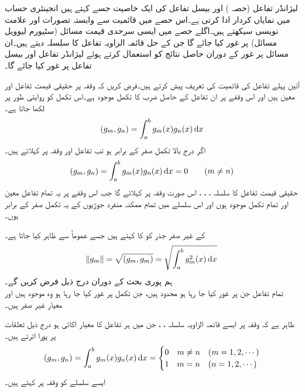 لیژانڈر تفاعل (حصہ ) اور بیسل تفاعل کی ایک خاصیت جسے  کہتے ہیں انجینئری حساب میں نمایاں کردار ادا کرتی ہے۔اس حصے میں قائمیت سے وابستہ تصورات اور  علامت نویسی سیکھتے ہیں۔اگلے حصے میں  ایسی سرحدی قیمت مسائل (سٹیورم لیوویل مسائل) پر غور کیا جائے گا جن کے حل قائمہ الزاویہ تفاعل کا سلسلہ دیتے ہیں۔ان مسائل  پر غور کے دوران حاصل نتائج کو استعمال کرتے ہوئے لیژانڈر تفاعل اور بیسل تفاعل پر غور کیا جائے گا۔

آئیں پہلے تفاعل کی قائمیت کی تعریف پیش کرتے ہیں۔فرض کریں کہ وقفہ  پر حقیقی قیمت تفاعل  اور  معین ہیں اور اس وقفے پر ان تفاعل کے حاصل ضرب  کا تکمل موجود ہے۔اس تکمل کو روایتی طور پر  لکھا جاتا ہے۔
\begin{align}
(g_m,g_n)=\int_{a}^{b} g_m(x)g_n(x)\dif x
\end{align}
اگر درج بالا تکمل صفر کے برابر ہو تب تفاعل  اور  وقفہ  پر   کہلاتے ہیں۔
\begin{align}
(g_m,g_n)=\int_{a}^{b} g_m(x)g_n(x)\dif x=0\quad \quad (m \ne n)
\end{align}
حقیقی قیمت تفاعل کا سلسلہ ، ، ،  اس صورت وقفہ   پر   کہلائے گا جب اس وقفے پر یہ تمام تفاعل معین اور تمام تکمل  موجود ہوں اور اس سلسلے میں تمام ممکنہ منفرد جوڑیوں کے یہ تکمل صفر کے برابر ہوں۔ 

 کے غیر صفر جذر کو  کا  کہتے ہیں جسے عموماً  سے ظاہر کیا جاتا ہے۔
\begin{align}
\norm{g_m}=\sqrt{(g_m,g_m)}=\sqrt{\int_{a}^{b} g_m^2(x)\dif x}
\end{align}
ہم پوری بحث کے دوران درج ذیل فرض کریں گے۔\\
 \quad تمام تفاعل جن پر غور کیا جا رہا ہو محدود ہیں، جن تکمل پر غور کیا جا رہا ہو وہ موجود ہیں اور معیار غیر صفر ہیں۔

 ظاہر ہے کہ وقفہ  پر ایسے قائمہ الزاویہ سلسلہ ، ،  جن  میں ہر تفاعل کا معیار اکائی  ہو درج ذیل تعلقات پر پورا اترتے ہیں۔
\begin{align}
(g_m,g_n)=\int_{a}^{b}g_m(x) g_n(x)\dif x=
\begin{cases}
0 & m\ne n \quad (m=1,2,\cdots)\\
1& m=n \quad (n=1,2,\cdots)
\end{cases}
\end{align}
ایسے سلسلے کو وقفہ  پر  کہتے ہیں۔

